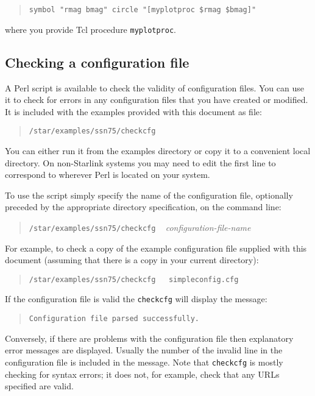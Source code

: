 \documentclass[twoside,11pt]{article}
\renewcommand{\_}{\texttt{\symbol{95}}}
\begin{document}
\begin{quote}
{\tt symbol "rmag bmag" circle "[my\_plot\_proc \$rmag \$bmag]"}
\end{quote}

where you provide Tcl procedure {\tt my\_plot\_proc}.

\subsection{\label{CHECKCFG_R}Checking a configuration file}

A Perl script is available to check the validity of configuration files.
You can use it to check for errors in any configuration files that you
have created or modified.  It is included with the examples provided with
this document as file:

\begin{quote}
{\tt /star/examples/ssn75/checkcfg}
\end{quote}

You can either run it from the examples directory or copy it to a
convenient local directory.  On non-Starlink systems you may need to edit
the first line to correspond to wherever Perl is located on your system.

To use the script simply specify the name of the configuration file,
optionally preceded by the appropriate directory specification, on the
command line:

\begin{quote}
{\tt /star/examples/ssn75/checkcfg} ~ {\it configuration-file-name}
\end{quote}

For example, to check a copy of the example configuration file supplied
with this document (assuming that there is a copy in your current
directory):

\begin{quote}
{\tt /star/examples/ssn75/checkcfg ~ simpleconfig.cfg}
\end{quote}

If the configuration file is valid the {\tt checkcfg} will display the
message:

\begin{quote}
{\tt Configuration file parsed successfully.}
\end{quote}

Conversely, if there are problems with the configuration file then
explanatory error messages are displayed.  Usually the number of the
invalid line in the configuration file is included in the message.
Note that {\tt checkcfg} is mostly checking for syntax errors; it does
not, for example, check that any URLs specified are valid.
\end{document}
